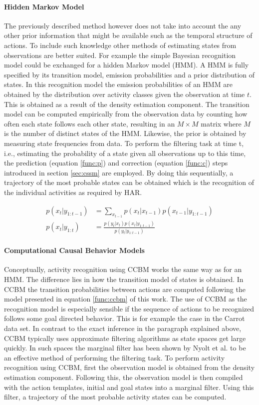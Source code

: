\documentclass[11pt,titlepage,oneside,openany]{book}
\begin{document}
\paragraph{Hidden Markov Model}
The previously described method however does not take into account the any other prior information that might be available such as the temporal structure of actions. To include such knowledge other methods of estimating states from observations are better suited. For example the simple Bayesian recognition model could be exchanged for a hidden Markov model (HMM). A HMM is fully specified by its transition model, emission probabilities and a prior distribution of states. In this recognition model the emission probabilities of an HMM are obtained by the distribution over activity classes given the observation at time $t$. This is obtained as a result of the density estimation component. The transition model can be computed empirically from the observation data by counting how often each state follows each other state, resulting in an $M \times M$ matrix where $M$ is the number of distinct states of the HMM. Likewise, the prior is obtained by measuring state frequencies from data. To perform the filtering task at time t, i.e., estimating the probability of a state given all observations up to this time, the prediction (equation \ref{func:p}) and correction (equation \ref{func:c}) steps introduced in section \ref{sec:cssm} are employed. By doing this sequentially, a trajectory of the most probable states can be obtained which is the recognition of the individual activities as required by HAR.

\begin{align}
	p(x_t|y_{1:t-1}) &= \sum_{x_{t-1}} p(x_t|x_{t-1}) p(x_{t-1}|y_{1:t-1}) \label{func:p} \\
	p(x_t|y_{1:t}) &= \frac{p(y_t|x_t) p(x_t|y_{1:t-1})}{p(y_t|y_{1:t-1})} \label{func:c}
\end{align}

\paragraph{Computational Causal Behavior Models}
Conceptually, activity recognition using CCBM works the same way as for an HMM. The difference lies in how the transition model of states is obtained. In CCBM the transition probabilities between actions are computed following the model presented in equation \ref{func:ccbm} of this work. The use of CCBM as the recognition model is especially sensible if the sequence of actions to be recognized follows some goal directed behavior. This is for example the case in the Carrot data set. In contrast to the exact inference in the paragraph explained above, CCBM typically uses approximate filtering algorithms as state spaces get large quickly. In such spaces the marginal filter has been shown by Nyolt et al. \cite{nyolt_marginal_2015} to be an effective method of performing the filtering task. To perform activity recognition using CCBM, first the observation model is obtained from the density estimation component. Following this, the observation model is then compiled with the action templates, initial and goal states into a marginal filter. Using this filter, a trajectory of the most probable activity states can be computed.
\end{document}
